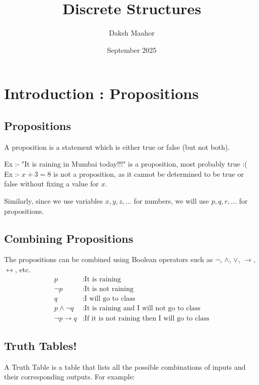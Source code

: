 \documentclass[14pt]{extarticle}
\title{\vspace{-2.5cm}Discrete Structures}
\author{Daksh Maahor}
\date{September 2025}
\newcommand{\impl}{\xrightarrow{}}
\newcommand{\ifff}{\longleftrightarrow}
\begin{document}
\maketitle

\tableofcontents
\newpage

\section{Introduction : Propositions}

\subsection{Propositions}
\noindent A proposition is a statement which is either true or false (but not both).

\noindent Ex :- "It is raining in Mumbai today!!!" is a proposition, most probably true :( \\
\noindent Ex :- $x+3 = 8$ is not a proposition, as it cannot be determined to be true or false without fixing a value for $x$.

\noindent Similarly, since we use variables $x, y, z, \dots$ for numbers, we will use $p, q, r, \dots$ for propositions.

\subsection{Combining Propositions}
The propositions can be combined using Boolean operators such as $\neg$, $\land$, $\lor$, $\impl$, $\ifff$, etc.
\begin{align*}
    p &: \text{It is raining} \\
    \neg p &: \text{It is not raining} \\
    q &: \text{I will go to class} \\
    p \land \neg q &: \text{It is raining and I will not go to class} \\
    \neg p \impl q &: \text{If it is not raining then I will go to class}
\end{align*}

\subsection{Truth Tables!}
A Truth Table is a table that lists all the possible combinations of inputs and their corresponding outputs. For example:
\end{document}
